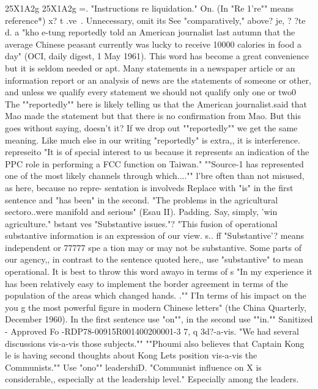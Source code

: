 \documentclass[
    oneside,
    11pt,
    draft
]{memoir}
\begin{document}
25X1A2g 25X1A2g =. "Instructions re liquidation." On. (In "Re 1're"" means reference*) x? t .ve~. Unnecessary, omit its See "comparatively," above? je, ? ?te d. a "kho e-tung reportedly told an American journalist last autumn that the average Chinese peasant currently was lucky to receive 10000 calories in food a day" (OCI, daily digest, 1 May 1961). This word has become a great convenience but it is seldom needed or apt. Many statements in a newspaper article or an information report or an analysis of news are the statements of someone or other, and unless we qualify every statement we should not qualify only one or two0 The ""reportedly"" here is likely telling us that the American journalist.said that Mao made the statement but that there is no confirmation from Mao. But this goes without saying, doesn't it? If we drop out ""reportedly"" we get the same meaning. Like much else in our writing "reportedly" is extra,, it is interference. represeito "It is of special interest to us because it represents an indication of the PPC role in performing a FCC function on Taiwan." ""Source-1 has represented one of the most likely channels through which...."" l'bre often than not misused, as here, because no repre- sentation is involveds Replace with "is" in the first sentence and "has been" in the second. "The problems in the agricultural sectoro..were manifold and serious" (Esau II). Padding. Say, simply, 'win agriculture." bstant ves "Substantive issues."? "This fusion of operational substantive information is an expression of our view. s.. ff "Substantive'? means independent or 77777 spe a tion may or may not be substantive. Some parts of our agency,, in contrast to the sentence quoted here,, use "substantive" to mean operational. It is best to throw this word awayo in terms of s "In my experience it has been relatively easy to implement the border agreement in terms of the population of the areas which changed hands. ."" I'In terms of his impact on the you g the most powerful figure in modern Chinese letters" (the China Quarterly, December 1960). In the first sentence use "on"", in the second use ""in.""
Sanitized - Approved Fo -RDP78-00915R001400200001-3 7, q 3d?-a-vis. "We had several discussions vis-a-vis those subjects."" ""Phoumi also believes that Captain Kong le is having second thoughts about Kong Lets position vis-a-vis the Communists."" Use "ono"" leadershiD. "Communist influence on X is considerable,, especially at the leadership level." Especially among the leaders.
\end{document}
